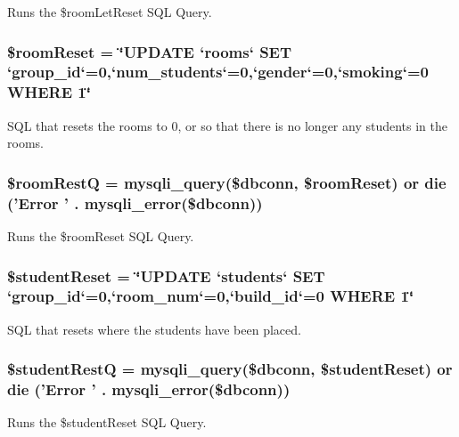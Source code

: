 \-Runs the \$room\-Let\-Reset \-S\-Q\-L \-Query. \hypertarget{autoReset_8php_aacb611dbf5c84e030f2c54eff45ca222}{
\subsubsection[{\$room\-Reset}]{\setlength{\rightskip}{0pt plus 5cm}\$room\-Reset = \char`\"{}\-U\-P\-D\-A\-T\-E `rooms` \-S\-E\-T `group\-\_\-id`=0,`num\-\_\-students`=0,`gender`=0,`smoking`=0 \-W\-H\-E\-R\-E 1\char`\"{}}}\label{autoReset_8php_aacb611dbf5c84e030f2c54eff45ca222}
\-S\-Q\-L that resets the rooms to 0, or so that there is no longer any students in the rooms. \hypertarget{autoReset_8php_a5ee9920a3f7aaf091b8092eefdb65239}{
\subsubsection[{\$room\-Rest\-Q}]{\setlength{\rightskip}{0pt plus 5cm}\$room\-Rest\-Q = mysqli\-\_\-query(\$dbconn, \$room\-Reset) or die ('\-Error ' . mysqli\-\_\-error(\$dbconn))}}\label{autoReset_8php_a5ee9920a3f7aaf091b8092eefdb65239}
\-Runs the \$room\-Reset \-S\-Q\-L \-Query. \hypertarget{autoReset_8php_a9b9cdc0f04cb545881acb36c15d42c5e}{
\subsubsection[{\$student\-Reset}]{\setlength{\rightskip}{0pt plus 5cm}\$student\-Reset = \char`\"{}\-U\-P\-D\-A\-T\-E `students` \-S\-E\-T `group\-\_\-id`=0,`room\-\_\-num`=0,`build\-\_\-id`=0 \-W\-H\-E\-R\-E 1\char`\"{}}}\label{autoReset_8php_a9b9cdc0f04cb545881acb36c15d42c5e}
\-S\-Q\-L that resets where the students have been placed. \hypertarget{autoReset_8php_ad531504cb204dbfaa4c9f041dba740e6}{
\subsubsection[{\$student\-Rest\-Q}]{\setlength{\rightskip}{0pt plus 5cm}\$student\-Rest\-Q = mysqli\-\_\-query(\$dbconn, \$student\-Reset) or die ('\-Error ' . mysqli\-\_\-error(\$dbconn))}}\label{autoReset_8php_ad531504cb204dbfaa4c9f041dba740e6}
\-Runs the \$student\-Reset \-S\-Q\-L \-Query. \hypertarget{autoReset_8php_a3ad3a4240c0f97c7e85aff5c52a454d4}{
\subsubsection[{print}]{}}\label{autoReset_8php_a3ad3a4240c0f97c7e85aff5c52a454d4}
